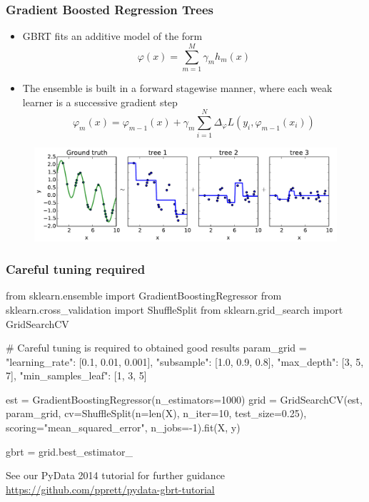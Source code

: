 \documentclass{beamer}
\begin{document}
\begin{frame}
  \frametitle{Gradient Boosted Regression Trees \citep{friedman:2001}}

  \begin{itemize}
  \item GBRT fits an additive model of the form
  $$\varphi(x) =  \sum_{m=1}^M \gamma_m h_m(x)$$

  \item The ensemble is built in a forward stagewise manner, where each weak
        learner is a successive gradient step
        $$\varphi_m(x) =  \varphi_{m-1}(x) + \gamma_m \sum_{i=1}^N \Delta_\varphi L(y_i, \varphi_{m-1}(x_i))$$
  \end{itemize}

    \begin{figure}
       \centering
       \includegraphics[width=\textwidth]{./figures/residual_fitting_2.pdf}
    \end{figure}

\end{frame}

\begin{frame}[fragile]
  \frametitle{Careful tuning required}

{\scriptsize
\begin{pythoncode}
from sklearn.ensemble import GradientBoostingRegressor
from sklearn.cross_validation import ShuffleSplit
from sklearn.grid_search import GridSearchCV

# Careful tuning is required to obtained good results
param_grid = {"learning_rate": [0.1, 0.01, 0.001],
              "subsample": [1.0, 0.9, 0.8],
              "max_depth": [3, 5, 7],
              "min_samples_leaf": [1, 3, 5]}

est = GradientBoostingRegressor(n_estimators=1000)
grid = GridSearchCV(est, param_grid,
                    cv=ShuffleSplit(n=len(X), n_iter=10, test_size=0.25),
                    scoring="mean_squared_error",
                    n_jobs=-1).fit(X, y)

gbrt = grid.best_estimator_
\end{pythoncode}
}

\begin{center}
See our PyData 2014 tutorial for further guidance
\url{https://github.com/pprett/pydata-gbrt-tutorial}
\end{center}

\end{frame}
\end{document}
